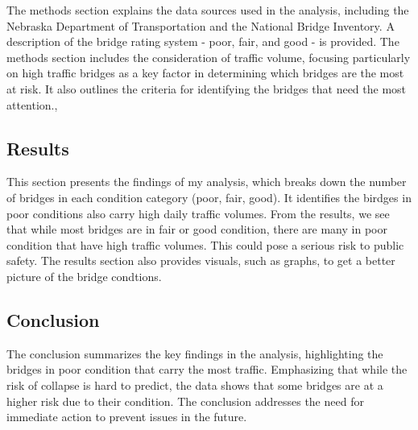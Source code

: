 \documentclass[
  letterpaper,
  DIV=11,
  numbers=noendperiod]{scrreprt}
\begin{document}
The methods section explains the data sources used in the analysis,
including the Nebraska Department of Transportation and the National
Bridge Inventory. A description of the bridge rating system - poor,
fair, and good - is provided. The methods section includes the
consideration of traffic volume, focusing particularly on high traffic
bridges as a key factor in determining which bridges are the most at
risk. It also outlines the criteria for identifying the bridges that
need the most attention.,

\subsection{Results}\label{results-3}

This section presents the findings of my analysis, which breaks down the
number of bridges in each condition category (poor, fair, good). It
identifies the birdges in poor conditions also carry high daily traffic
volumes. From the results, we see that while most bridges are in fair or
good condition, there are many in poor condition that have high traffic
volumes. This could pose a serious risk to public safety. The results
section also provides visuals, such as graphs, to get a better picture
of the bridge condtions.

\subsection{Conclusion}\label{conclusion-3}

The conclusion summarizes the key findings in the analysis, highlighting
the bridges in poor condition that carry the most traffic. Emphasizing
that while the risk of collapse is hard to predict, the data shows that
some bridges are at a higher risk due to their condition. The conclusion
addresses the need for immediate action to prevent issues in the future.
\end{document}
